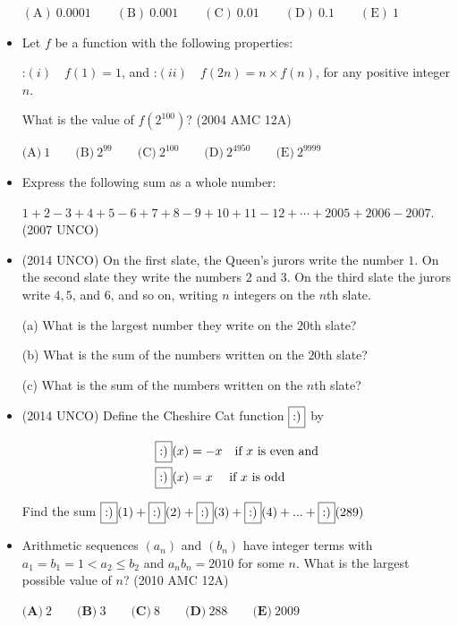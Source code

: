 \documentclass{article}
\begin{document}
\begin{itemize}
$ \mathrm{(A) \ } 0.0001\qquad \mathrm{(B) \ } 0.001\qquad \mathrm{(C) \ } 0.01\qquad \mathrm{(D) \ } 0.1\qquad \mathrm{(E) \ } 1 $

\item Let $f$ be a function with the following properties:

:$(i)\quad f(1) = 1$, and
:$(ii)\quad f(2n) = n\times f(n)$, for any positive integer $n$.

What is the value of $f(2^{100})$? (2004 AMC 12A)

$\text {(A)}\ 1 \qquad \text {(B)}\ 2^{99} \qquad \text {(C)}\ 2^{100} \qquad \text {(D)}\ 2^{4950} \qquad \text {(E)}\ 2^{9999}$

\item Express the following sum as a whole number:

$1+ 2 - 3 + 4 + 5 - 6 + 7 + 8 - 9 +10 +11-12 +\cdots + 2005 + 2006 - 2007.$ (2007 UNCO)

%
\item (2014 UNCO) On the first slate, the Queen’s jurors write the number $1$. On the second slate they write the
numbers $2$ and $3$. On the third slate the jurors write $4, 5$, and $6$, and so on, writing $n$ integers on
the $n$th slate.

(a) What is the largest number they write on the $20$th slate?

(b) What is the sum of the numbers written on the $20$th slate?

(c) What is the sum of the numbers written on the $n$th slate?

\item (2014 UNCO) Define the Cheshire Cat function $\fbox{:)}$ by

\begin{align*} 
\fbox{:)}(x) &= -x \quad \text {if } x \text{ is even and} \\
\fbox{:)}(x) &= x \quad \text{ if  }x \text{ is odd} 
\end{align*}

Find the sum $\fbox{:)}(1) + \fbox{:)}(2) + \fbox{:)}(3) + \fbox{:)}(4) + . . .+ \fbox{:)}(289)$

\item Arithmetic sequences $\left(a_n\right)$ and $\left(b_n\right)$ have integer terms with $a_1=b_1=1<a_2 \le b_2$ and $a_n b_n = 2010$ for some $n$. What is the largest possible value of $n$? (2010 AMC 12A)

$\textbf{(A)}\ 2 \qquad \textbf{(B)}\ 3 \qquad \textbf{(C)}\ 8 \qquad \textbf{(D)}\ 288 \qquad \textbf{(E)}\ 2009$



\end{itemize}
\end{document}
